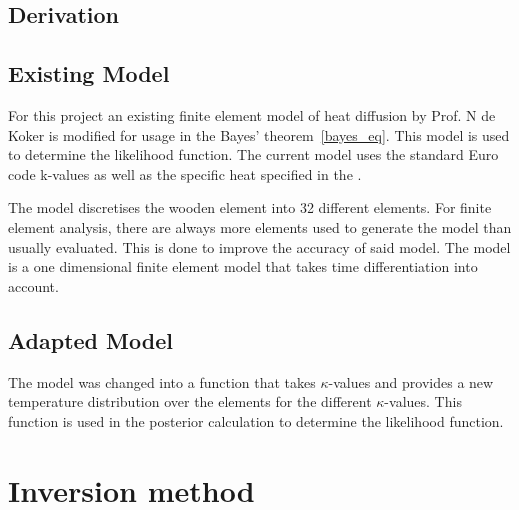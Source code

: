 	\subsection{Derivation}%
	
	\subsection{Existing Model}
	For this project an existing finite element model of heat diffusion by Prof. N de Koker is modified for usage in the Bayes' theorem~\ref{bayes_eq}. 
	This model is used to determine the likelihood function. 
	The current model uses the standard Euro code k-values as well as the specific heat specified in the \citep{Euro:2004}. 
	
	The model discretises the wooden element into 32 different elements. For finite element analysis, there are always more elements used to generate the model than usually evaluated. This is done to improve the accuracy of said model.
	The model is a one dimensional finite element model that takes time differentiation into account.
	
	\subsection{Adapted Model}	
	The model was changed into a function that takes $\kappa$-values and provides a new temperature distribution over the elements for the different $\kappa$-values. 
	This function is used in the posterior calculation to determine the likelihood function.
	


\section{Inversion method}
